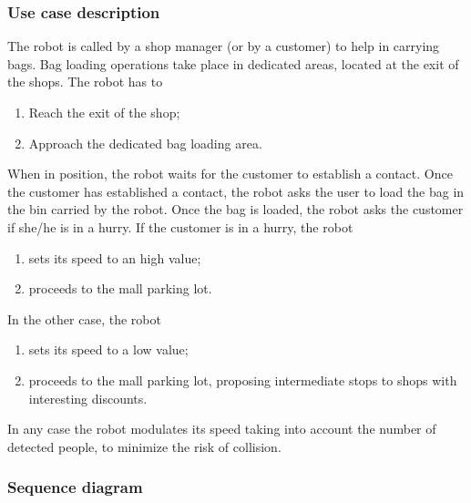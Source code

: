 \subsubsection{Use case description}

The robot is called by a shop manager (or by a customer) to help
in carrying bags. Bag loading operations take place in dedicated areas,
located at the exit of the shops.
The robot has to
\begin{enumerate}
\item Reach the exit of the shop;
\item Approach the dedicated bag loading area.
\end{enumerate}

\noindent When in position, the robot waits for the customer to establish
a contact.
Once the customer has established a contact, the robot asks the user
to load the bag in the bin carried by the robot.
Once the bag is loaded, the robot asks the customer if she/he is in a hurry.
If the customer is in a hurry, the robot
\begin{enumerate}
\item sets its speed to an high value;
\item proceeds to the mall parking lot.
\end{enumerate}

\noindent In the other case, the robot
\begin{enumerate}
\item sets its speed to a low value;
\item proceeds to the mall parking lot, proposing intermediate stops to shops
with interesting discounts.
\end{enumerate}

In any case the robot modulates its speed taking into account the number of detected people,
to minimize the risk of collision.

\subsubsection{Sequence diagram}

